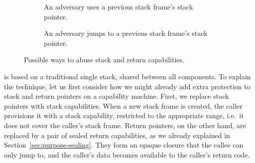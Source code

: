 \documentclass[acmsmall,screen]{acmart}\settopmatter{}
\begin{document}
\begin{figure}
\begin{subfigure}{0.4\linewidth}
    \caption{An adversary uses a previous stack frame's stack pointer.}
    \label{fig:stack-ptr-abuse}
  \end{subfigure}
  \begin{subfigure}{0.18\linewidth}
    \phantom{testtestes}
  \end{subfigure}
  \begin{subfigure}{0.4\linewidth}
    \centering
    \caption{An adversary jumps to a previous stack frame's stack pointer.}
    \label{fig:ret-ptr-abuse}
  \end{subfigure}
  
  \caption{Possible ways to abuse stack and return capabilities.}
  \label{fig:stack-ret-ptr-abuse}
\end{figure}

\stktokens{} is based on a traditional single stack, shared between all components.
To explain the technique, let us first consider how we might already add extra protection to stack and return pointers on a capability machine.
First, we replace stack pointers with stack capabilities.
When a new stack frame is created, the caller provisions it with a stack capability, restricted to the appropriate range, i.e.\ it does not cover the caller's stack frame.
Return pointers, on the other hand, are replaced by a pair of sealed return capabilities, as we already explained in Section~\ref{sec:purpose-sealing}.
They form an opaque closure that the callee can only jump to, and the caller's data becomes available to the caller's return code. 
\end{document}

